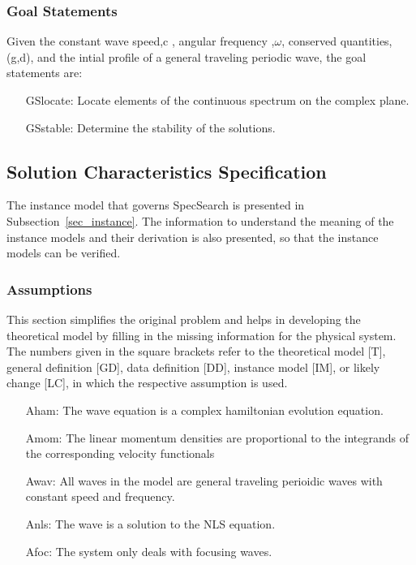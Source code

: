 \documentclass[12pt]{article}
\begin{document}
\subsubsection{Goal Statements}

\noindent Given the constant wave speed,c , angular frequency ,$\omega$, 
conserved quantities, (g,d), and the intial profile of a general traveling 
periodic wave, the goal statements are:

\begin{itemize}[leftmargin=.75in]

\item[GSlocate:] {Locate elements of the continuous spectrum on the 
complex plane. }

\item[GSstable:] {Determine the stability of the solutions.}

\end{itemize}

\subsection{Solution Characteristics Specification}

The instance model that governs SpecSearch is presented in
Subsection~\ref{sec_instance}.  The information to understand the meaning of the
instance models and their derivation is also presented, so that the instance
models can be verified.

\subsubsection{Assumptions}

This section simplifies the original problem and helps in developing the
theoretical model by filling in the missing information for the physical
system. The numbers given in the square brackets refer to the theoretical model
[T], general definition [GD], data definition [DD], instance model [IM], or
likely change [LC], in which the respective assumption is used.

\begin{itemize}[leftmargin=.5in]

\item[Aham:]The 
wave equation is a complex hamiltonian evolution equation. 
\item[Amom:]The 
linear momentum densities are proportional to the integrands of the 
corresponding velocity functionals 
\item[Awav:]All 
waves in the model are general traveling perioidic waves with constant speed 
and frequency. 
\item[Anls:]The 
wave is a solution to the NLS equation.
\item[Afoc:]The 
system only deals with focusing waves.

\end{itemize}
\end{document}
